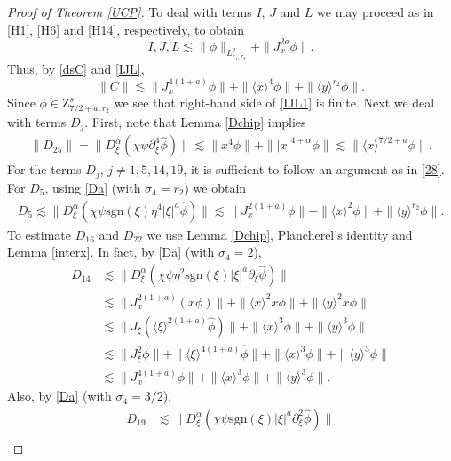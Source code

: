 \documentclass[reqno]{amsart}
\newcommand{\ha}{\hat{\phi}}
\newcommand{\les}{\lesssim}
\newcommand{\lan}{\langle \xi \rangle}
\newcommand{\lanx}{\langle x \rangle}
\newcommand{\lany}{\langle y \rangle}
\newcommand{\dt}{D^{\alpha}_\xi}
\newcommand{\p}{\partial}
\newcommand{\sgn}{\text{sgn}}
\numberwithin{equation}{section}
\begin{document}
\begin{proof}[Proof of Theorem \ref{UCP}]
To deal with terms $I$, $J$ and $L$ we may proceed as in \eqref{H1}, \eqref{H6} and \eqref{H14}, respectively, to obtain
\begin{equation}\label{IJL}
I,J,L\les\|\phi\|_{L^2_{r_1,r_2}}+\|J_x^{2a}\phi\|.
\end{equation} 
Thus, by \eqref{dsC} and \eqref{IJL}, 
\begin{equation}\label{IJL1}
\|C\|\les \|J_x^{4(1+a)}\phi\|+\|\lanx^4 \phi\|+\|\lany^{r_2}\phi\|.
\end{equation}
Since $\phi\in \mathrm{Z}_{7/2+a,r_2}^{s}$ we see that right-hand side of \eqref{IJL1} is finite. Next we deal with terms $D_j$. First, note that  Lemma \ref{Dchip} implies
\begin{equation}
\begin{split}\label{28}
\|D_{25}\|=\|\dt (\chi \psi \p_\xi^4 \ha )\|
\lesssim \|x^4\phi\|+\||x|^{4+\alpha}\phi\|
\les\|\lanx^{7/2+a}\phi\|.
\end{split}
\end{equation}
For the terms  $D_j$, $j\neq 1,5,14,19$, it is sufficient to follow an argument as in \eqref{28}. For  $D_5$, using \ref{Da} (with $\sigma_4=r_2$) we obtain
\begin{equation*}
\begin{split}
D_5 \lesssim\|\dt (\chi \psi \sgn(\xi) \eta^4 |\xi|^a  \ha)\|
\lesssim \|J_x^{2(1+a)}\phi\|+\|\lanx^2 \phi\|+\|\lany^{r_2}\phi\|.
\end{split}
\end{equation*}
To estimate $D_{16}$ and $D_{22}$ we use Lemma \ref{Dchip}, Plancherel's identity and Lemma \ref{interx}. In fact, by \eqref{Da} (with $\sigma_4=2$),
\begin{equation*}
\begin{split}
D_{14} &\les \|\dt (\chi \psi \eta^2 \sgn(\xi)|\xi|^a \p_\xi \ha)\|\\
&\lesssim \|J_x^{2(1+a)}(x\phi)\|+\|\lanx^2 x\phi\|+\|\lany^{2}x\phi\|\\
&\les\|J_\xi(\lan^{2(1+a)}\ha)\|+\|\lanx^3 \phi\|+\|\lany^3\phi\|\\
&\les\|J_\xi^2 \ha\|+\|\lan^{4(1+a)}\ha\|+\|\lanx^3 \phi\|+\|\lany^3\phi\|\\
&\les\|J_x^{4(1+a)}\phi\|+\|\lanx^3 \phi\|+\|\lany^3\phi\|.
\end{split}
\end{equation*}
Also, by \eqref{Da} (with $\sigma_4=3/2$),
\begin{equation*}
\begin{split}
D_{19} &\lesssim \|\dt (\chi\psi \sgn(\xi)|\xi|^a \p_\xi^2 \ha)\|\\

\end{split}
\end{equation*}
\end{proof}
\end{document}
